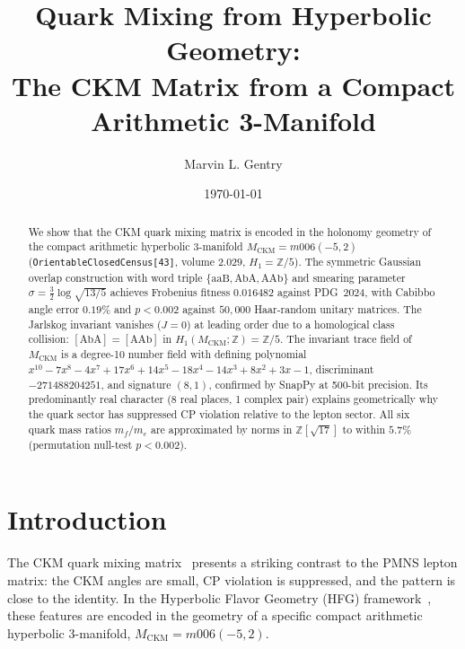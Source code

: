 \documentclass[11pt,a4paper]{article}
\theoremstyle{remark}
\newcommand{\MCKM}{M_{\mathrm{CKM}}}
\newcommand{\Zfive}{\mathbb{Z}/5}
\newcommand{\ZZ}{\mathbb{Z}}
\begin{document}
\title{Quark Mixing from Hyperbolic Geometry:\\
The CKM Matrix from a Compact Arithmetic 3-Manifold}

\author[1]{Marvin L. Gentry}
\date{\today}
\maketitle

\begin{abstract}
We show that the CKM quark mixing matrix is encoded in the holonomy
geometry of the compact arithmetic hyperbolic 3-manifold
$\MCKM = m006(-5,2)$ (\texttt{OrientableClosedCensus[43]},
volume $2.029$, $H_1=\Zfive$).
The symmetric Gaussian overlap construction with word triple
$\{\mathrm{aaB},\mathrm{AbA},\mathrm{AAb}\}$ and smearing parameter
$\sigma = \frac{3}{2}\log\sqrt{13/5}$ achieves Frobenius fitness
$0.016482$ against PDG~2024, with Cabibbo angle error $0.19\%$
and $p<0.002$ against $50{,}000$ Haar-random unitary matrices.
The Jarlskog invariant vanishes ($J=0$) at leading order due to a
homological class collision: $[\mathrm{AbA}]=[\mathrm{AAb}]$ in
$H_1(\MCKM;\ZZ)=\Zfive$.
The invariant trace field of $\MCKM$ is a degree-10 number field
with defining polynomial
$x^{10}-7x^8-4x^7+17x^6+14x^5-18x^4-14x^3+8x^2+3x-1$,
discriminant $-271488204251$, and signature $(8,1)$,
confirmed by SnapPy at 500-bit precision.
Its predominantly real character (8 real places, 1 complex pair)
explains geometrically why the quark sector has suppressed CP
violation relative to the lepton sector.
All six quark mass ratios $m_f/m_e$ are approximated by norms in
$\ZZ[\sqrt{17}]$ to within $5.7\%$ (permutation null-test $p<0.002$).
\end{abstract}


\section{Introduction}
\label{sec:intro}

The CKM quark mixing matrix~\cite{CKM} presents a striking
contrast to the PMNS lepton matrix: the CKM angles are small,
CP violation is suppressed, and the pattern is close to the identity.
In the Hyperbolic Flavor Geometry (HFG) framework~\cite{Gentry:Unified},
these features are encoded in the geometry of a specific compact
arithmetic hyperbolic 3-manifold, $\MCKM = m006(-5,2)$.
\end{document}
